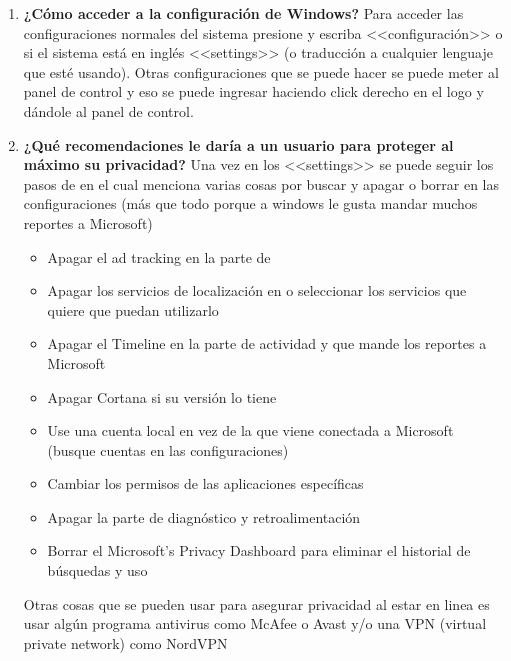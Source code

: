 \documentclass[stu, 12pt, letterpaper, donotrepeattitle, floatsintext, natbib, helv]{apa7}
\begin{document}
\begin{enumerate}
    \item \textbf{¿Cómo acceder a la configuración de Windows?} 
    Para acceder las configuraciones normales del sistema presione \keys{\OS} y escriba <<configuración>> o si el sistema está en inglés <<settings>> (o traducción a cualquier lenguaje que esté usando). Otras configuraciones que se puede hacer se puede meter al panel de control y eso se puede ingresar haciendo click derecho en el logo \OS \space y dándole al panel de control.

    \item \textbf{¿Qué recomendaciones le daría a un usuario para proteger al máximo su privacidad?} Una vez en los <<settings>> se puede seguir los pasos de  en el cual menciona varias cosas por buscar y apagar o borrar en las configuraciones (más que todo porque a windows le gusta mandar muchos reportes a Microsoft)
    \begin{itemize}
        \item Apagar el ad tracking en la parte de 
        \item Apagar los servicios de localización en  o seleccionar los servicios que quiere que puedan utilizarlo
        \item Apagar el Timeline en la parte de actividad y que mande los reportes a Microsoft 
        \item Apagar Cortana si su versión lo tiene
        \item Use una cuenta local en vez de la que viene conectada a Microsoft (busque cuentas en las configuraciones)
        \item Cambiar los permisos de las aplicaciones específicas
        \item Apagar la parte de diagnóstico y retroalimentación 
        \item Borrar el Microsoft's Privacy Dashboard para eliminar el historial de búsquedas y uso
    \end{itemize}
    Otras cosas que se pueden usar para asegurar privacidad al estar en linea es usar algún programa antivirus como McAfee o Avast y/o una VPN (virtual private network) como NordVPN 


\end{enumerate}
\end{document}
